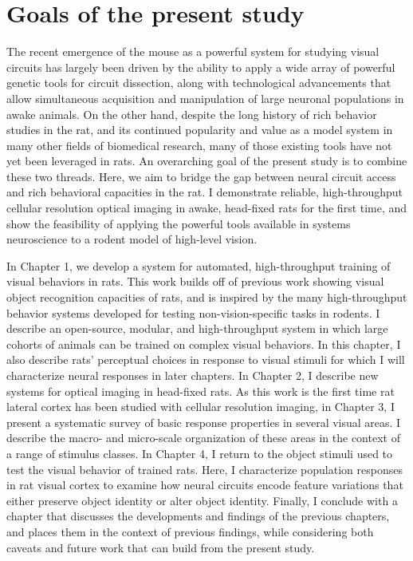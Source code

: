 \section{Goals of the present study}
The recent emergence of the mouse as a powerful system for studying visual circuits has largely been driven by the ability to apply a wide array of powerful genetic tools for circuit dissection, along with technological advancements that allow simultaneous acquisition and manipulation of large neuronal populations in awake animals. On the other hand, despite the long history of rich behavior studies in the rat, and its continued popularity and value as a model system in many other fields of biomedical research, many of those existing tools have not yet been leveraged in rats. An overarching goal of the present study is to combine these two threads. Here, we aim to bridge the gap between neural circuit access and rich behavioral capacities in the rat. I demonstrate reliable, high-throughput cellular resolution optical imaging in awake, head-fixed rats for the first time, and show the feasibility of applying the powerful tools available in systems neuroscience to a rodent model of high-level vision. 

In Chapter 1, we develop a system for automated, high-throughput training of visual behaviors in rats. This work builds off of previous work showing visual object recognition capacities of rats, and is inspired by the many high-throughput behavior systems developed for testing non-vision-specific tasks in rodents. I describe an open-source, modular, and high-throughput system in which large cohorts of animals can be trained on complex visual behaviors. In this chapter, I also describe rats' perceptual choices in response to visual stimuli for which I will characterize neural responses in later chapters. In Chapter 2, I describe new systems for optical imaging in head-fixed rats. As this work is the first time rat lateral cortex has been studied with cellular resolution imaging, in Chapter 3, I present a systematic survey of basic response properties in several visual areas. I describe the macro- and micro-scale organization of these areas in the context of a range of stimulus classes. In Chapter 4, I return to the object stimuli used to test the visual behavior of trained rats. Here, I characterize population responses in rat visual cortex to examine how neural circuits encode feature variations that either preserve object identity or alter object identity. Finally, I conclude with a chapter that discusses the developments and findings of the previous chapters, and places them in the context of previous findings, while considering both caveats and future work that can build from the present study.

